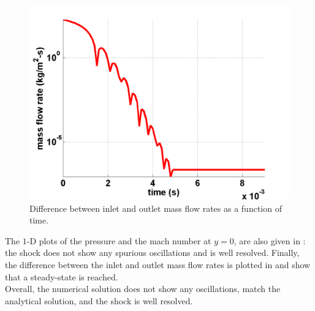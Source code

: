         \begin{figure}[H]%
                \centering
                \includegraphics[scale=.50]{figures/CompressionCorner2DQ.png}
                \caption{Difference between inlet and outlet mass flow rates as a function of time.}
                \label{fig:2d_convergence}
        \end{figure}
The $1$-D plots of the pressure and the mach number at $y=0$, are also given in : the shock does not show any spurious oscillations and is well resolved. Finally, the difference between the inlet and outlet mass flow rates is plotted in  and show that a steady-state is reached. \\
Overall, the numerical solution does not show any oscillations, match the analytical solution, and the shock is well resolved.
